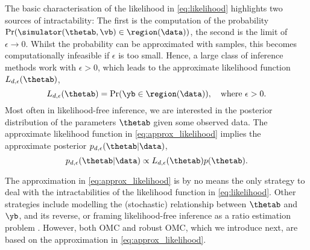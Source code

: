 The basic characterisation of the likelihood in \eqref{eq:likelihood}
highlights two sources of intractability: The first is the computation
of the probability $\Pr(\simulator(\thetab,\vb) \in \region(\data))$,
the second is the limit of $\epsilon \to 0$.  Whilst the probability
can be approximated with samples, this becomes computationally
infeasible if $\epsilon$ is too small. Hence, a large class of
inference methods work with $\epsilon >0$, which leads to the
approximate likelihood function $L_{d, \epsilon}(\thetab)$,
\begin{equation} \label{eq:approx_likelihood}
  L_{d, \epsilon}(\thetab) = \Pr(\yb \in \region(\data)), \quad \text{where  } \epsilon > 0.
\end{equation}
Most often in likelihood-free inference, we are interested in the
posterior distribution of the parameters $\thetab$ given some observed
data. The approximate likelihood function in
\eqref{eq:approx_likelihood} implies the approximate posterior
$p_{d,\epsilon}(\thetab|\data)$,
\begin{equation} \label{eq:approx_posterior}
  p_{d,\epsilon}(\thetab|\data) \propto L_{d, \epsilon}(\thetab) p(\thetab).
\end{equation}

The approximation in \eqref{eq:approx_likelihood} is by no means the
only strategy to deal with the intractabilities of the likelihood
function in \eqref{eq:likelihood}. Other strategies include modelling
the (stochastic) relationship between $\thetab$ and $\yb$, and its
reverse, or framing likelihood-free inference as a ratio estimation
problem \citep[see e.g.\ ][]{Blum2010, Wood2010, Papamakarios2016,
  Thomas2016, Papamakarios2019, Chen2019, Thomas2020,
  Hermans2020}. However, both OMC and robust OMC, which we introduce
next, are based on the approximation in \eqref{eq:approx_likelihood}.





